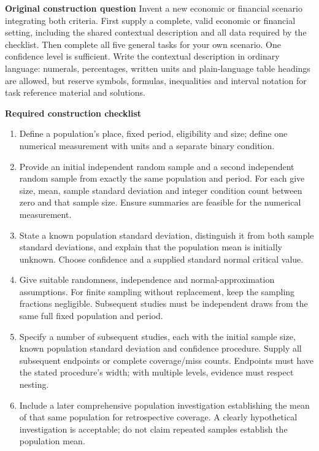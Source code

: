 \secInicio[][sec:p2]

\clearpage


\textbf{Original construction question}
Invent a new economic or financial scenario integrating both criteria. First supply a complete, valid economic or financial setting, including the shared contextual description and all data required by the checklist. Then complete all five general tasks for your own scenario. One confidence level is sufficient. Write the contextual description in ordinary language: numerals, percentages, written units and plain-language table headings are allowed, but reserve symbols, formulas, inequalities and interval notation for task reference material and solutions.

\textbf{Required construction checklist}
\begin{enumerate}
\item Define a population's place, fixed period, eligibility and size; define one numerical measurement with units and a separate binary condition.
\item Provide an initial independent random sample and a second independent random sample from exactly the same population and period. For each give size, mean, sample standard deviation and integer condition count between zero and that sample size. Ensure summaries are feasible for the numerical measurement.
\item State a known population standard deviation, distinguish it from both sample standard deviations, and explain that the population mean is initially unknown. Choose confidence and a supplied standard normal critical value.
\item Give suitable randomness, independence and normal-approximation assumptions. For finite sampling without replacement, keep the sampling fractions negligible. Subsequent studies must be independent draws from the same full fixed population and period.
\item Specify a number of subsequent studies, each with the initial sample size, known population standard deviation and confidence procedure. Supply all subsequent endpoints or complete coverage/miss counts. Endpoints must have the stated procedure's width; with multiple levels, evidence must respect nesting.
\item Include a later comprehensive population investigation establishing the mean of that same population for retrospective coverage. A clearly hypothetical investigation is acceptable; do not claim repeated samples establish the population mean.
\end{enumerate}

